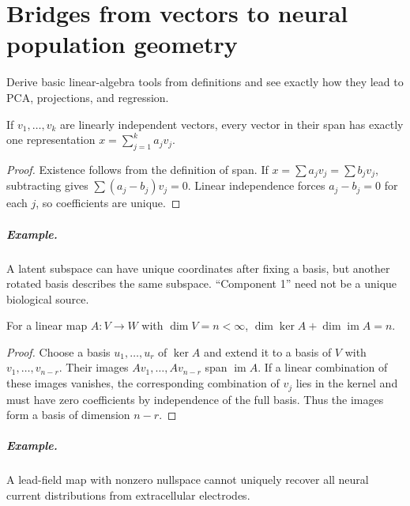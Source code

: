 \chapter{Bridges from vectors to neural population geometry}\label{ch:bridges-linear}
\begin{readergoal}Derive basic linear-algebra tools from definitions and see exactly how they lead to PCA, projections, and regression.\end{readergoal}

\begin{proposition}If $v_1,\ldots,v_k$ are linearly independent vectors, every vector in their span has exactly one representation $x=\sum_{j=1}^k a_jv_j$.\end{proposition}
\begin{proof}Existence follows from the definition of span. If $x=\sum a_jv_j=\sum b_jv_j$, subtracting gives $\sum(a_j-b_j)v_j=0$. Linear independence forces $a_j-b_j=0$ for each $j$, so coefficients are unique.\end{proof}
\paragraph{Example.} A latent subspace can have unique coordinates after fixing a basis, but another rotated basis describes the same subspace. ``Component 1'' need not be a unique biological source.

\begin{theorem}For a linear map $A:V\to W$ with $\dim V=n<\infty$, $\dim\ker A+\dim\operatorname{im}A=n$.\end{theorem}
\begin{proof}Choose a basis $u_1,\ldots,u_r$ of $\ker A$ and extend it to a basis of $V$ with $v_1,\ldots,v_{n-r}$. Their images $Av_1,\ldots,Av_{n-r}$ span $\operatorname{im}A$. If a linear combination of these images vanishes, the corresponding combination of $v_j$ lies in the kernel and must have zero coefficients by independence of the full basis. Thus the images form a basis of dimension $n-r$.\end{proof}
\paragraph{Example.} A lead-field map with nonzero nullspace cannot uniquely recover all neural current distributions from extracellular electrodes.

